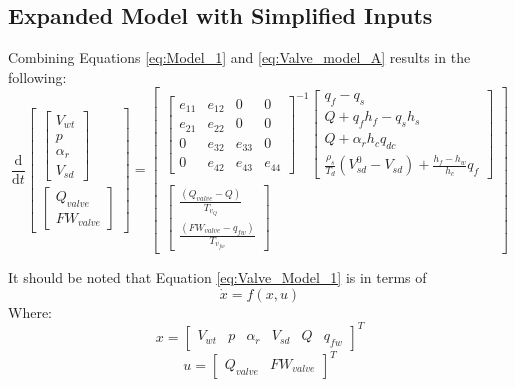     \subsection{Expanded Model with Simplified Inputs}
        Combining Equations \ref{eq:Model_1} and \ref{eq:Valve_model_A} results in the following:
        \begin{equation}
            \label{eq:Valve_Model_1}
            \frac{\mathrm{d} }{\mathrm{d} t} 
            \left [ \begin{matrix} \left [ \begin{matrix} V_{wt}\\ p\\ \alpha_r\\ V_{sd}\end{matrix} \right ]  \\ \left [ \begin{matrix} Q_{valve} \\ FW_{valve} \end{matrix} \right ] \end{matrix} \right ]  
            =
            \left [ \begin{matrix}  \left [ \begin{matrix}e_{11}& e_{12}& 0& 0 \\ e_{21}& e_{22}& 0& 0 \\ 0 & e_{32}& e_{33}& 0 \\ 0 & e_{42}& e_{43}& e_{44}\end{matrix} \right ] ^{-1} \left [ \begin{matrix} q_f  - q_s \\ Q + q_f h_f  - q_s h_s\\ Q + \alpha_r h_c q_{dc} \\ \frac{\rho_s}{T_d}  \left ( V_{sd}^0  - V_{sd}\right ) + \frac{h_f - h_w}{h_c}q_f \end{matrix} 
            \right ] \\  \left[ \begin{matrix} \frac{\left(  Q_{valve}  - Q       \right)}{T_{v_{Q }}} \\\frac{\left( FW_{valve}  - q_{fw}  \right)}{T_{v_{fw}}}   \end{matrix} \right]  \end{matrix} \right ]
        \end{equation}
     
        It should be noted that Equation \ref{eq:Valve_Model_1} is in terms of
        $$ \dot{x} = f\left (x, u\right)$$
        Where:
        $$ x = \left [\begin{matrix} V_{wt} & p & \alpha_r & V_{sd} & Q & q_{fw}\end{matrix} \right]^T$$
        $$ u = \left [\begin{matrix} Q_{valve} & FW_{valve} \end{matrix} \right]^T$$        
        
